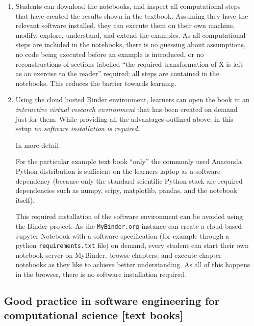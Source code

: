 \documentclass{deliverablereport}
\begin{document}
\begin{enumerate}
\item Students can download the notebooks, and inspect all
  computational steps that have created the results shown in the
  textbook. Assuming they have the relevant software installed,
  they can execute them on their own machine, modify,
  explore, understand, and extend the examples. As all computational
  steps are included in the notebooks, there is no guessing about
  assumptions, no code being executed before an example is introduced,
  or no reconstructions of sections labelled ``the required
  transformation of X is left as an exercise to the reader'' required:
  all steps are contained in the notebooks. This reduces the barrier
  towards learning.

\item Using the cloud hosted Binder environment, learners can open
  the book in an \emph{interactive virtual research environment} that
  has been created on demand just for them. While providing all the
  advantages outlined above, in this setup \emph{no software
    installation is required}.

  In more detail:

  For the particular example text book ``only'' the commonly used
  Anaconda Python distribution is sufficient on the learners laptop as
  a software dependency (because  only the standard scientific Python stack
  are required dependencies such as numpy, scipy, matplotlib, pandas,
  and the notebook itself).

  This required installation of the software environment can be
  avoided using the Binder project. As the
  \texttt{MyBinder.org} instance can create a cloud-based Jupyter
  Notebook with a software specification (for example through a python
  \texttt{requirements.txt} file) on demand, every student can start
  their own notebook server on MyBinder, browse chapters, and execute
  chapter notebooks as they like to achieve better understanding. As
  all of this happens in the browser, there is no software
  installation required.
\end{enumerate}

\subsection{Good practice in software engineering for
  computational science [text books]}\label{sec:good-pract-softw}
\end{document}
